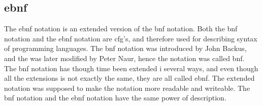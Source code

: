 \begin{comment}
An example of a \ac{cfg} from .

\begin{tabular}{l l l}
$A$ & $\rightarrow$ & $0A1$ \\
$A$ & $\rightarrow$ & $B$ \\
$B$ & $\rightarrow$ & $\#$ \\
\end{tabular}

In the gramma above the rules shows that $A$ can be substituted by either $0A1$ or $B$.

\subsection{\ac{bnf}}
The notation \ac{bnf}, is an form of a \ac{cfg}, and it was introduced by John Backus, and the notation was later modified by Peter Naur, and the notation was called \ac{bnf}\cite{concepts_prog_lang}. \\
\ac{bnf} is an other way of descriping syntax of a programming language. Like a \ac{cfg}, a \ac{bnf} is a collection of rules, which also uses \textit{terminals} and \textit{nonterminals}. An example of \ac{bnf} used to descripe a simple Java assignment statement is written as

\begin{tabular}{l l l}
$<\texttt{assign}>$ & $\rightarrow$ & $<\texttt{var}> \; = \; <\texttt{expression}>$ 
\end{tabular}

where $<\texttt{assign}>$ is an abstract reprecentation of an assignment statement, and the rule specifies that $<\texttt{assign}>$ is defined as an instance of the abstraction $<\texttt{var}>$ followed by the `=' symbol, and then followed by the abstraction $<\texttt{expression}>$.
\end{comment}

\subsection{\ac{ebnf}}
The \ac{ebnf} notation is an extended version of the \ac{bnf} notation. Both the \ac{bnf} notation and the \ac{ebnf} notation are \ac{cfg}'s, and therefore used for describing syntax of programming languages. The \ac{bnf} notation was introduced by John Backus, and the was later modified by Peter Naur, hence the notation was called \ac{bnf}. \\
The \ac{bnf} notation has though time been extended i several ways, and even though all the extensions is not exactly the same, they are all called \ac{ebnf}. The extended notation was supposed to make the notation more readable and writeable. The \ac{bnf} notation and the \ac{ebnf} notation have the same power of description. 

